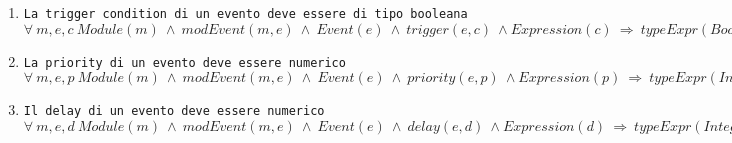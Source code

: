 
\begin{enumerate}
	\item \texttt{La trigger condition di un evento deve essere di tipo booleana} \\
		  $\forall \ m,e,c \ Module(m) \ \land \ modEvent(m, e) \ \land \ Event(e) \ \land \ trigger(e, c) \ \land Expression(c) \ \Rightarrow \ typeExpr(Boolean, c)$ \\
	\item \texttt{La priority di un evento deve essere numerico} \\
		  $\forall \ m,e,p \ Module(m) \ \land \ modEvent(m, e) \ \land \ Event(e) \ \land \ priority(e, p) \ \land Expression(p) \ \Rightarrow \ typeExpr(Integer, p) \ \lor \ typeExpr(Real, p)$ \\
	\item \texttt{Il delay di un evento deve essere numerico} \\
		  $\forall \ m,e,d \ Module(m) \ \land \ modEvent(m, e) \ \land \ Event(e) \ \land \ delay(e, d) \ \land Expression(d) \ \Rightarrow \ typeExpr(Integer, d) \ \lor \ typeExpr(Real, d)$ \\
\end{enumerate}